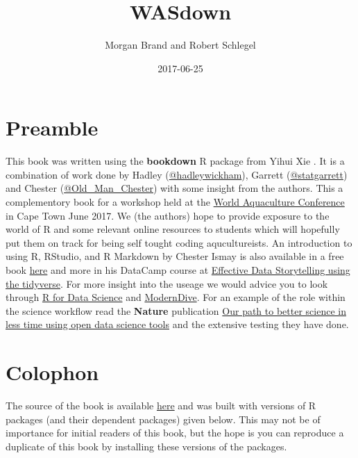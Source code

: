 \documentclass[]{book}
\title{WASdown}
\author{Morgan Brand and Robert Schlegel}
\date{2017-06-25}
\theoremstyle{definition}
\theoremstyle{definition}
\theoremstyle{remark}
\begin{document}
\maketitle

{
\setcounter{tocdepth}{1}
\tableofcontents
}
\chapter*{Preamble}\label{preamble}

This book was written using the \textbf{bookdown} R package from Yihui
Xie \citep{R-bookdown}. It is a combination of work done by Hadley
(\href{https://twitter.com/hadleywickham}{@hadleywickham}), Garrett
(\href{https://twitter.com/statgarrett}{@statgarrett}) and Chester
(\href{https://twitter.com/old_man_chester}{@Old\_Man\_Chester}) with
some insight from the authors. This a complementory book for a workshop
held at the
\href{https://www.was.org/meetings/default.aspx?code=WA2017}{World
Aquaculture Conference} in Cape Town June 2017. We (the authors) hope to
provide exposure to the world of R and some relevant online resources to
students which will hopefully put them on track for being self tought
coding aqucultureists. An introduction to using R, RStudio, and R
Markdown by Chester Ismay is also available in a free book
\href{http://ismayc.github.io/rbasics-book}{here} and more in his
DataCamp course at
\href{https://www.datacamp.com/courses/3085}{Effective Data Storytelling
using the tidyverse}. For more insight into the useage we would advice
you to look through \href{http://r4ds.had.co.nz/index.html}{R for Data
Science} and
\href{https://ismayc.github.io/moderndiver-book/}{ModernDive}. For an
example of the role within the science workflow read the \textbf{Nature}
publication \href{https://www.nature.com/articles/s41559-017-0160}{Our
path to better science in less time using open data science tools} and
the extensive testing they have done.

\chapter*{Colophon}\label{colophon}

The source of the book is available
\href{https://github.com/schrob040/R_WAS/tree/master/WASdown}{here} and
was built with versions of R packages (and their dependent packages)
given below. This may not be of importance for initial readers of this
book, but the hope is you can reproduce a duplicate of this book by
installing these versions of the packages.
\end{document}
